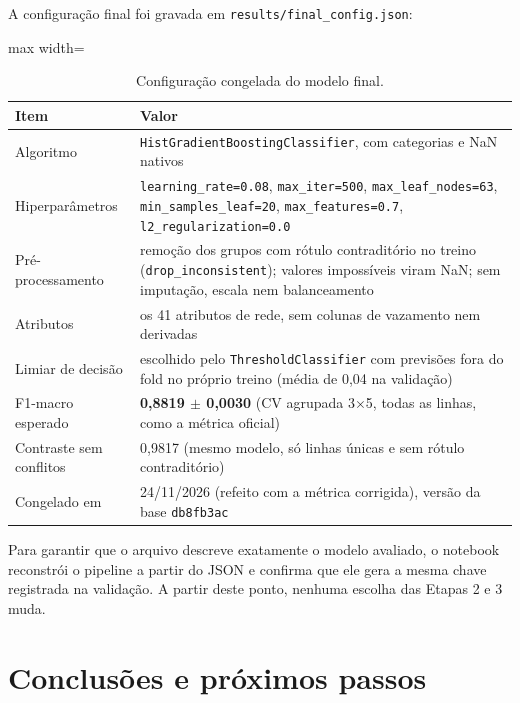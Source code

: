 \documentclass[11pt,a4paper]{article}
\begin{document}
A configuração final foi gravada em \texttt{results/final\_config.json}:

\begin{table}[H]
\centering
\caption{Configuração congelada do modelo final.}
\begin{adjustbox}{max width=\linewidth}
\begin{tabular}{ll}
\toprule
Item & Valor \\
\midrule
Algoritmo & \texttt{HistGradientBoostingClassifier}, com categorias e NaN nativos \\
Hiperparâmetros & \texttt{learning\_rate=0.08}, \texttt{max\_iter=500}, \texttt{max\_leaf\_nodes=63}, \texttt{min\_samples\_leaf=20}, \texttt{max\_features=0.7}, \texttt{l2\_regularization=0.0} \\
Pré-processamento & remoção dos grupos com rótulo contraditório no treino (\texttt{drop\_inconsistent}); valores impossíveis viram NaN; sem imputação, escala nem balanceamento \\
Atributos & os 41 atributos de rede, sem colunas de vazamento nem derivadas \\
Limiar de decisão & escolhido pelo \texttt{ThresholdClassifier} com previsões fora do fold no próprio treino (média de 0,04 na validação) \\
F1-macro esperado & \textbf{0,8819 $\pm$ 0,0030} (CV agrupada 3$\times$5, todas as linhas, como a métrica oficial) \\
Contraste sem conflitos & 0,9817 (mesmo modelo, só linhas únicas e sem rótulo contraditório) \\
Congelado em & 24/11/2026 (refeito com a métrica corrigida), versão da base \texttt{db8fb3ac} \\
\bottomrule
\end{tabular}
\end{adjustbox}
\end{table}

Para garantir que o arquivo descreve exatamente o modelo avaliado, o notebook reconstrói o pipeline a partir do JSON e confirma que ele gera a mesma chave registrada na validação. A partir deste ponto, nenhuma escolha das Etapas 2 e 3 muda.

\section{Conclusões e próximos passos}
\end{document}

